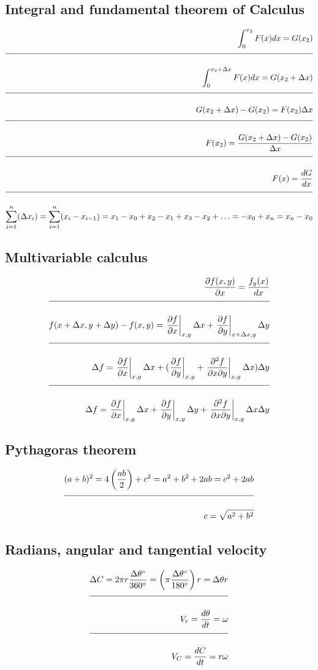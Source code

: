 \documentclass[a4paper]{article}
\newcommand{\n}{\\[1.5ex] \hline \nonumber \\[0ex]}
\begin{document}
\subsection{Integral and fundamental theorem of Calculus}
\begin{tcolorbox}
\begin{align}
   \int_{0}^{x_2} F(x) dx = G(x_2)
\n \int_{0}^{x_2 + \Delta x} F(x) dx = G(x_2 + \Delta x)
\n G(x_2 + \Delta x) - G(x_2) = F(x_2) \Delta x
\n F(x_2) = \frac{G(x_2 + \Delta x) - G(x_2)}{\Delta x}
\n F(x) = \frac{dG}{dx}
\n \sum_{i=1}^{n}(\Delta x_i) = \sum_{i=1}^{n}(x_i - x_{i-1}) = x_1 - x_0 + x_2 - x_1 + x_3 - x_2 + \ldots = -x_0 + x_n = x_n - x_0
\end{align}
\end{tcolorbox}

\subsection{Multivariable calculus}
\begin{tcolorbox}
\begin{align}
   \frac{\partial f(x, y)}{\partial x} = \frac{f_y(x)}{dx}
\n f(x + \Delta x, y + \Delta y) - f(x, y) = \left. \frac{\partial f}{\partial x} \right|_{x, y} \Delta x + \left. \frac{\partial f}{\partial y} \right|_{x + \Delta x, y} \Delta y
\n \Delta f = \left. \frac{\partial f}{\partial x} \right|_{x, y} \Delta x + (\left. \frac{\partial f}{\partial y} \right|_{x, y} + \left. \frac{\partial^2 f}{\partial x \partial y} \right|_{x, y} \Delta x) \Delta y
\n \Delta f = \left. \frac{\partial f}{\partial x} \right|_{x, y} \Delta x + \left. \frac{\partial f}{\partial y} \right|_{x, y} \Delta y + \left. \frac{\partial^2 f}{\partial x \partial y} \right|_{x, y} \Delta x \Delta y
\end{align}
\end{tcolorbox}

\subsection{Pythagoras theorem}
\begin{tcolorbox}
\begin{align}
   (a + b)^2 = 4 \left(\frac{a b}{2}\right) + c^2 = a^2 + b^2 + 2 a b = c^2 + 2 a b
\n c = \sqrt{a^2 + b^2}
\end{align}
\end{tcolorbox}

\subsection{Radians, angular and tangential velocity}
\begin{tcolorbox}
\begin{align}
   \Delta C = 2 \pi r \frac{\Delta \theta \degree}{360 \degree} = \left(\pi \frac{\Delta \theta \degree}{180 \degree}\right) r = \Delta \theta r
\n V_r = \frac{d\theta}{dt} = \omega
\n V_C = \frac{dC}{dt} = r \omega
\end{align}
\end{tcolorbox}
\end{document}
